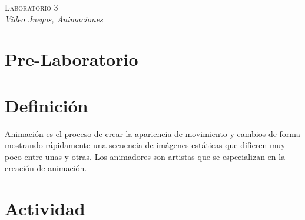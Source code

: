 \begin{center}
\textsc{\Large Laboratorio 3}~\\
\emph{\large Video Juegos, Animaciones}
\end{center}

\section{Pre-Laboratorio}

\section{Definición}
Animación es el proceso de crear la apariencia de movimiento y cambios de forma mostrando rápidamente una secuencia de imágenes estáticas que difieren muy poco entre unas y otras. Los animadores son artistas que se especializan en la creación de animación.

\section{Actividad}
